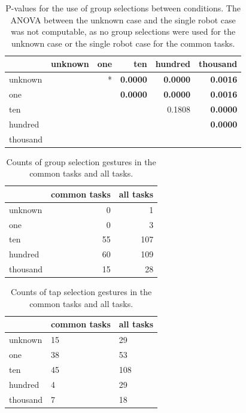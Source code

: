 \begin{table}
	\begin{tabular}{l|r r r r r }
		& unknown & one    & ten        & hundred     & thousand   \\ 
		\hline
		unknown & & * & \textbf{0.0000} & \textbf{0.0000} & \textbf{0.0016} \\   
		one & & & \textbf{0.0000} & \textbf{0.0000} & \textbf{0.0016} \\
		ten & & & & 0.1808 & \textbf{0.0000}   \\
		hundred & & & & & \textbf{0.0000}   \\
		thousand & & & & &\\
	\end{tabular}
	\caption{P-values for the use of group selections between conditions. The ANOVA between the unknown case and the single robot case was not computable, as no group selections were used for the unknown case or the single robot case for the common tasks.}
	\label{tab:group_select_per_task_norm}
\end{table}

\begin{table}
	\centering
	\begin{tabular}{l | r r }
		& common tasks & all tasks\\
		\hline
		unknown & 0 & 1\\
		one & 0 & 3\\
		ten & 55 & 107 \\
		hundred & 60 & 109\\
		thousand & 15 & 28\\
	\end{tabular}
	\caption{Counts of group selection gestures in the common tasks and all tasks.}
	\label{tab:group_raw_counts}
\end{table}

\begin{table}
	\centering
	\begin{tabular}{l | l l}
		& common tasks & all tasks\\
		\hline
		unknown & 15 & 29\\
		one & 38 & 53 \\
		ten & 45 & 108\\
		hundred & 4 & 29 \\
		thousand & 7 & 18\\
	\end{tabular}
	\caption{Counts of tap selection gestures in the common tasks and all tasks.}
	\label{tab:tap_raw_counts}
\end{table}

